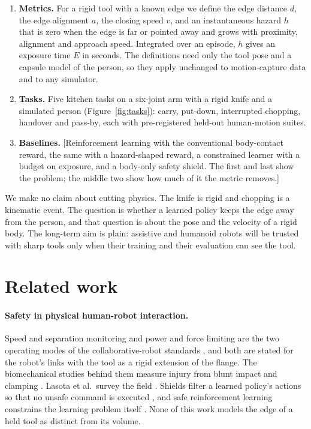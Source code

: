 \documentclass[11pt,letterpaper]{article}
\newcommand{\todo}[1]{{\color{red}[#1]}}
\begin{document}
\begin{enumerate}[leftmargin=1.5em]
\item \textbf{Metrics.} For a rigid tool with a known edge we define the edge distance $d$, the edge alignment $a$, the closing speed $v$, and an instantaneous hazard $h$ that is zero when the edge is far or pointed away and grows with proximity, alignment and approach speed. Integrated over an episode, $h$ gives an exposure time $E$ in seconds. The definitions need only the tool pose and a capsule model of the person, so they apply unchanged to motion-capture data and to any simulator.
\item \textbf{Tasks.} Five kitchen tasks on a six-joint arm with a rigid knife and a simulated person (Figure~\ref{fig:tasks}): carry, put-down, interrupted chopping, handover and pass-by, each with pre-registered held-out human-motion suites.
\item \textbf{Baselines.} \todo{Reinforcement learning with the conventional body-contact reward, the same with a hazard-shaped reward, a constrained learner with a budget on exposure, and a body-only safety shield. The first and last show the problem; the middle two show how much of it the metric removes.}
\end{enumerate}

We make no claim about cutting physics. The knife is rigid and chopping is a kinematic event. The question is whether a learned policy keeps the edge away from the person, and that question is about the pose and the velocity of a rigid body. The long-term aim is plain: assistive and humanoid robots will be trusted with sharp tools only when their training and their evaluation can see the tool.

\section{Related work}
\paragraph{Safety in physical human-robot interaction.}
Speed and separation monitoring and power and force limiting are the two operating modes of the collaborative-robot standards \cite{iso10218,iso15066}, and both are stated for the robot's links with the tool as a rigid extension of the flange. The biomechanical studies behind them measure injury from blunt impact and clamping \cite{haddadin2009requirements}. Lasota et al.\ survey the field \cite{lasota2017survey}. Shields filter a learned policy's actions so that no unsafe command is executed \cite{alshiekh2018shielding,thumm2022provably}, and safe reinforcement learning constrains the learning problem itself \cite{garcia2015safe}. None of this work models the edge of a held tool as distinct from its volume.
\end{document}
